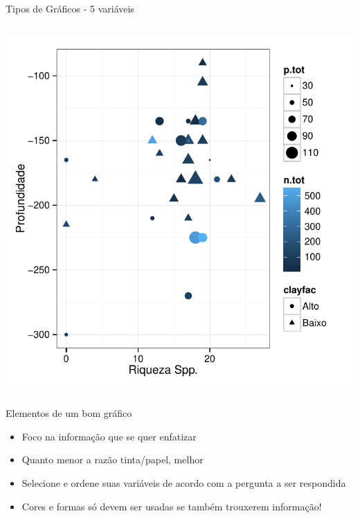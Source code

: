 \documentclass{beamer}\usepackage[]{graphicx}\usepackage[]{color}
\newenvironment{knitrout}{}{} %
\renewenvironment{knitrout}{\setlength{\topsep}{0mm}}{}
\begin{document}
\begin{frame}[fragile]{Tipos de Gráficos - 5 variáveis}
\begin{columns}[t]
\begin{knitrout}
\color{fgcolor}
\includegraphics[width=1\linewidth]{figure/unnamed-chunk-86-1} 

\end{knitrout}

\end{columns}

\end{frame}

\begin{frame}{Elementos de um bom gráfico}
  
\begin{itemize}
  \item Foco na informação que se quer enfatizar \pause
  \vfill
  \item Quanto menor a razão tinta/papel, melhor \pause
  \vfill
  \item Selecione e ordene suas variáveis de acordo com a pergunta a ser respondida \pause
  \vfill
  \item Cores e formas só devem ser usadas se também trouxerem informação! \pause
\end{itemize}

\end{frame} 
\end{document}
